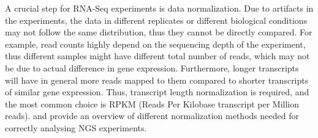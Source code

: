 A crucial step for RNA-Seq experiments is data normalization. Due to artifacts in the experiments, the data in different replicates or different biological conditions may not follow the same distribution, thus they cannot be directly compared. For example, read counts highly depend on the sequencing depth of the experiment, thus different samples might have different total number of reads, which may not be due to actual difference in gene expression. Furthermore, longer transcripts will have in general more reads mapped to them compared to shorter transcripts of similar gene expression. Thus, transcript length normalization is required, and the most common choice is RPKM (Reads Per Kilobase transcript per Million reads). \citet{Robinson2010} and \citet{Aleksic2014} provide an overview of different normalization methods needed for correctly analysing NGS experiments.
